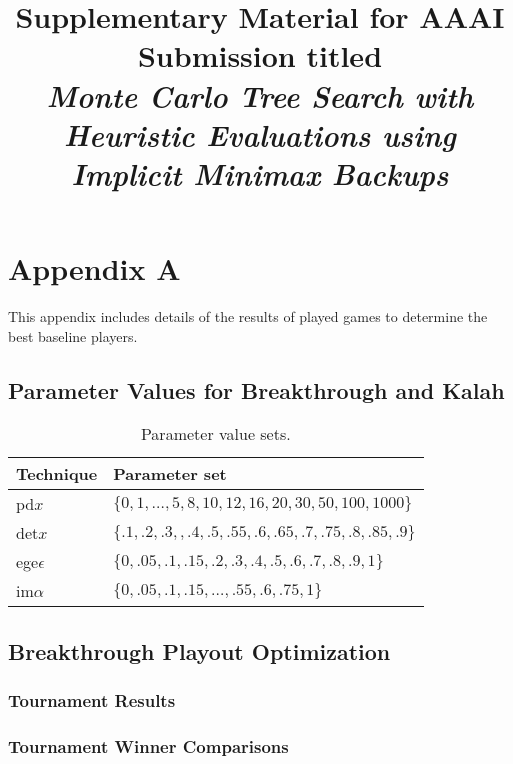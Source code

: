 \documentclass{article}
\title{Supplementary Material for AAAI Submission titled\\{\it Monte Carlo Tree Search with Heuristic Evaluations using Implicit Minimax Backups}}
\author{}
\date{}
\begin{document}
\maketitle %

\section{Appendix A}

This appendix includes details of the results of played games to determine the best baseline players. 

\subsection{Parameter Values for Breakthrough and Kalah}

\begin{table}[h!]
\begin{center}
\begin{tabular}{|l|l|}
\hline
Technique & Parameter set \\
\hline
pd$x$          & $\{ 0, 1, \ldots, 5, 8, 10, 12, 16, 20, 30, 50, 100, 1000 \}$ \\
det$x$         & $\{ .1, .2, .3, , .4, .5, .55, .6, .65, .7, .75, .8, .85, .9 \}$ \\
ege$\epsilon$  & $\{ 0, .05, .1, .15, .2, .3, .4, .5, .6, .7, .8, .9, 1 \}$ \\
im$\alpha$     & $\{ 0, .05, .1, .15, \ldots, .55, .6, .75, 1 \}$ \\
\hline
\end{tabular}
\end{center}
\caption{Parameter value sets.}
\label{tbl:parmsets}
\end{table}

\subsection{Breakthrough Playout Optimization}

\subsubsection{Tournament Results}

\subsubsection{Tournament Winner Comparisons}

%
\end{document}
